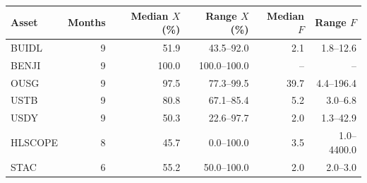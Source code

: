 \begin{tabular}{lrrrrr}
\toprule
Asset & Months & Median $X$ (\%) & Range $X$ (\%) & Median $F$ & Range $F$ \\
\midrule
BUIDL & 9 & 51.9 & 43.5--92.0 & 2.1 & 1.8--12.6 \\
BENJI & 9 & 100.0 & 100.0--100.0 & -- & -- \\
OUSG & 9 & 97.5 & 77.3--99.5 & 39.7 & 4.4--196.4 \\
USTB & 9 & 80.8 & 67.1--85.4 & 5.2 & 3.0--6.8 \\
USDY & 9 & 50.3 & 22.6--97.7 & 2.0 & 1.3--42.9 \\
HLSCOPE & 8 & 45.7 & 0.0--100.0 & 3.5 & 1.0--4400.0 \\
STAC & 6 & 55.2 & 50.0--100.0 & 2.0 & 2.0--3.0 \\
\bottomrule
\end{tabular}
